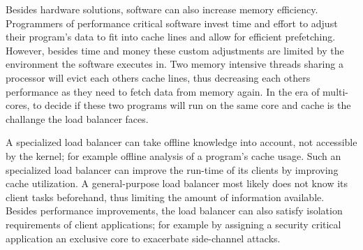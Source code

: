 \begin{comment}
Two hardware improvements minimize the time a CPU idles, while waiting for
memory: out-of-order execution and simultaneous multi-threading.
Out-of-order CPUs reorder instructions, such that a instruction waiting for
input data is surpassed by instructions with available input.
After execution the results are written to memory in their original order.
Whereas simultaneous multi-threading employs two or more hardware threads
executing on the same physical hardware.
If one hardware thread waits for memory or just uses a subset of all available
execution units, the others can utilize the idle resources.
\end{comment}
%
Besides hardware solutions, software can also increase memory efficiency.
Programmers of performance critical software invest time and effort to adjust
their program's data to fit into cache lines and allow for efficient prefetching.
However, besides time and money these custom adjustments are limited by the
environment the software executes in.
Two memory intensive threads sharing a processor will evict each others
cache lines, thus decreasing each others performance as they need to fetch
data from memory again.
In the era of multi-cores, to decide if these two programs will run on
the same core and cache is the challange the load balancer faces.

\begin{comment}
While Linux runs a scheduler which is also in charge of load balancing, these
are two separate jobs.
It is the scheduler's duty to provide an equal amount of CPU time to each
running task, depending on the task's priority.
To decide, which tasks runs on which core on the other hand,
that is the responsibility of the load balancer.

Thus, the load balancer is not necessarily part of the kernel.
To allow for workload specific load balancers, Linux provides an interface to
overrule kernel decisions.
This is also the case for the Fiasco.OC microkernel and the L4Re user-land
environment.
\end{comment}

A specialized load balancer can take offline knowledge into account, not
accessible by the kernel;
for example offline analysis of a program's cache usage.
Such an specialized load balancer can improve the run-time of its clients by
improving cache utilization.
A general-purpose load balancer most likely does not know its client tasks
beforehand, thus limiting the amount of information available.
Besides performance improvements, the load balancer can also satisfy isolation
requirements of client applications; for example by assigning a security
critical application an exclusive core to exacerbate side-channel attacks.

